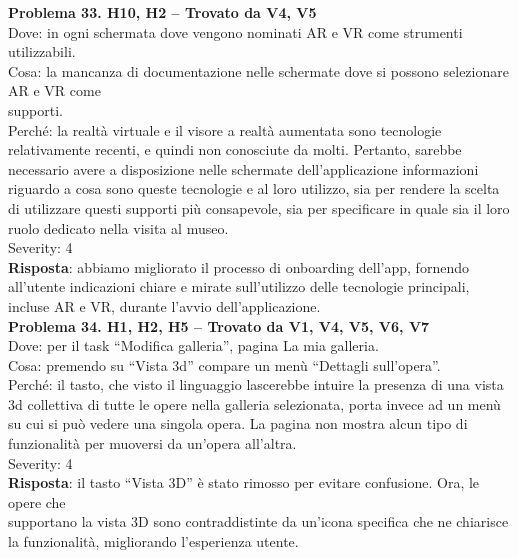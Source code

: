 \documentclass{article}
\begin{document}
\noindent \textbf{Problema 33. H10, H2 – Trovato da V4, V5} \\
Dove: in ogni schermata dove vengono nominati AR e VR come strumenti utilizzabili. \\
Cosa: la mancanza di documentazione nelle schermate dove si possono selezionare AR e VR come \\supporti. \\
Perché: la realtà virtuale e il visore a realtà aumentata sono tecnologie relativamente recenti, e quindi non conosciute da molti. Pertanto, sarebbe necessario avere a disposizione nelle schermate dell’applicazione informazioni riguardo a cosa sono queste tecnologie e al loro utilizzo, sia per rendere la scelta di utilizzare questi supporti più consapevole, sia per specificare in quale sia il loro ruolo dedicato nella visita al museo. \\
Severity: 4 \\
\textbf{Risposta}: abbiamo migliorato il processo di onboarding dell’app, fornendo all’utente indicazioni chiare e mirate sull’utilizzo delle tecnologie principali, incluse AR e VR, durante l’avvio dell’applicazione.\\

\noindent \textbf{Problema 34. H1, H2, H5 – Trovato da V1, V4, V5, V6, V7} \\
Dove: per il task “Modifica galleria”, pagina La mia galleria. \\
Cosa: premendo su “Vista 3d” compare un menù “Dettagli sull’opera”. \\
Perché: il tasto, che visto il linguaggio lascerebbe intuire la presenza di una vista 3d collettiva di tutte le opere nella galleria selezionata, porta invece ad un menù su cui si può vedere una singola opera. La pagina non mostra alcun tipo di funzionalità per muoversi da un’opera all’altra. \\
Severity: 4 \\
\textbf{Risposta}: il tasto “Vista 3D” è stato rimosso per evitare confusione. Ora, le opere che \\ supportano la vista 3D sono contraddistinte da un’icona specifica che ne chiarisce la funzionalità, migliorando l’esperienza utente.\\
\end{document}
